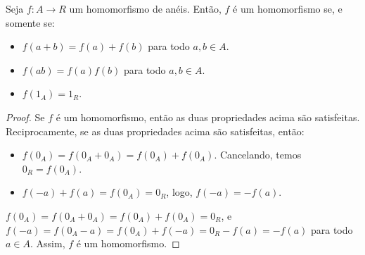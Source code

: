 \begin{prop}
    Seja $f:A\rightarrow R$ um homomorfismo de anéis. Então, $f$ é um homomorfismo se, e somente se:
    \begin{itemize}
        \item $f(a+b)=f(a)+f(b)$ para todo $a, b \in A$.
        \item $f(ab)=f(a)f(b)$ para todo $a, b \in A$.
        \item $f(1_A)=1_R$.
    \end{itemize}
\end{prop}
\begin{proof}
    Se $f$ é um homomorfismo, então as duas propriedades acima são satisfeitas. Reciprocamente, se as duas propriedades acima são satisfeitas, então:
    \begin{itemize}
    \item $f(0_A)=f(0_A+0_A)=f(0_A)+f(0_A)$. Cancelando, temos $0_R=f(0_A)$.
    \item $f(-a)+f(a)=f(0_A)=0_R$, logo, $f(-a)=-f(a)$.
    \end{itemize} $f(0_A)=f(0_A+0_A)=f(0_A)+f(0_A)=0_R$, e $f(-a)=f(0_A-a)=f(0_A)+f(-a)=0_R-f(a)=-f(a)$ para todo $a \in A$. Assim, $f$ é um homomorfismo.
\end{proof}